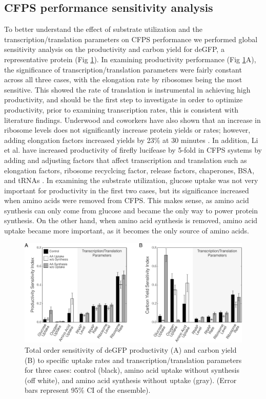 \documentclass[journal=asbcd6,manuscript=article]{achemso}
\begin{document}
\subsection{CFPS performance sensitivity analysis}
To better understand the effect of substrate utilization and the transcription/translation parameters on CFPS performance we performed global sensitivity analysis on the productivity and carbon yield for deGFP, a representative protein (Fig \ref{fig:SI_GFP}).
In examining productivity performance (Fig \ref{fig:SI_GFP}A), the significance of transcription/translation parameters were fairly constant across all three cases, with the elongation rate by ribosomes being the most sensitive.
This showed the rate of translation is instrumental in achieving high productivity, and should be the first step to investigate in order to optimize productivity, prior to examining transcription rates, this is consistent with literature findings.
Underwood and coworkers have also shown that an increase in ribosome levels does not significantly increase protein yields or rates; however, adding elongation factors increased yields by 23\% at 30 minutes \cite{2005_underwood_biotech}.
In addition, Li et al. have increased productivity of firefly lucifease by 5-fold in CFPS systems by adding and adjusting factors that affect transcription and translation such as elongation factors, ribosome recyclcing factor, release factors, chaperones, BSA, and tRNAs \cite{2014_li_PlosOne}.
In examining the substrate utilization, glucose uptake was not very important for productivity in the first two cases, but its significance increased when amino acids were removed from CFPS.
This makes sense, as amino acid synthesis can only come from glucose and became the only way to power protein synthesis.
On the other hand, when amino acid synthesis is removed, amino acid uptake became more important, as it becomes the only source of amino acids.
\begin{figure}[t!]
\includegraphics[width=1.00\textwidth]{./Figures/SI_GFP.pdf}
\caption{Total order sensitivity of deGFP productivity (A) and carbon yield (B) to specific uptake rates and transcription/translation parameters for three cases: control (black), amino acid uptake without synthesis (off white), and amino acid synthesis without uptake (gray). (Error bars represent 95\% CI of the ensemble).}
\label{fig:SI_GFP}
\end{figure}
\end{document}
